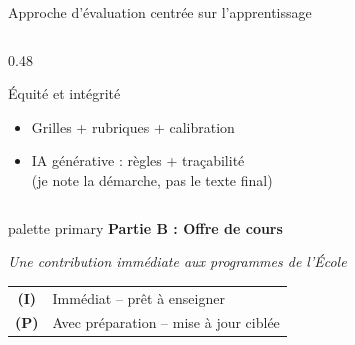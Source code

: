 \documentclass[aspectratio=169,11pt]{beamer}
\begin{document}
\begin{frame}{Approche d'évaluation centrée sur l'apprentissage}
\begin{columns}[T]
\begin{column}{0.48\textwidth}
      \vspace{0.2em}
      
      \begin{block}{Équité et intégrité}
        \scriptsize
        \begin{itemize}
          \item Grilles + rubriques + calibration
          \item IA générative : règles + traçabilité\\{\tiny (je note la démarche, pas le texte final)}
        \end{itemize}
      \end{block}
    \end{column}
  \end{columns}
\end{frame}

\begin{frame}{}
  \begin{beamercolorbox}[wd=\paperwidth,ht=2.5cm,dp=0.5cm,center]{palette primary}
    {\Large\bfseries Partie B : Offre de cours}
  \end{beamercolorbox}
  \vspace{1.5cm}
  \begin{center}
    {\large\textit{Une contribution immédiate aux programmes de l'École}}
    
    \vspace{1em}
    
    \begin{tabular}{cl}
      \textcolor{immediatgreen}{\textbf{(I)}} & Immédiat -- prêt à enseigner \\
      \textcolor{prepareorange}{\textbf{(P)}} & Avec préparation -- mise à jour ciblée \\
    \end{tabular}
  \end{center}
\end{frame}
\end{document}
